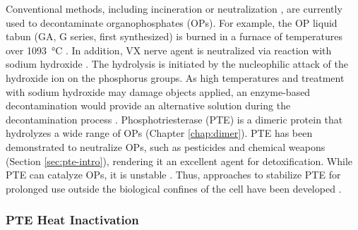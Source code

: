 \begin{refsection}
Conventional methods, including incineration or neutralization
\cite{Ghanem2005a,Porzio2007}, are currently used to decontaminate
organophosphates (OPs).  For example, the OP liquid tabun (GA, G series, first
synthesized) is burned in a furnace of temperatures over \SI{1093}{\celsius}
\cite{Afriat-Jurnou2012}.  In addition, VX nerve agent is neutralized via
reaction with sodium hydroxide \cite{Afriat-Jurnou2012}. The hydrolysis is
initiated by the nucleophilic attack of the hydroxide ion on the phosphorus
groups. As high temperatures and treatment with sodium hydroxide may damage
objects applied, an enzyme-based decontamination would provide an alternative
solution during the decontamination process \cite{Defrank}.  Phosphotriesterase
(PTE) is a dimeric protein that hydrolyzes a wide range of OPs \cite{
Lewis1988,Chen2007a,Mulbry1989,Benning2001a,Omburo1992a,Benning1995,Naqvi2014}
(Chapter \ref{chap:dimer}).  PTE has been demonstrated to neutralize OPs, such
as pesticides and chemical weapons
\cite{Chen-Goodspeed2001a,Hanusa2011,Aubert2004b,Chen-Goodspeed2001a,Bigley2013}
(Section \ref{sec:pte-intro}), rendering it an excellent agent for
detoxification. While PTE can catalyze OPs, it is unstable
\cite{Rochu2002b,LeJeune1997a,Tsai2012b,Defrank}.  Thus, approaches to
stabilize PTE for prolonged use outside the biological confines of the cell
have been developed
\cite{Rochu2002b,LeJeune1997a,Tsai2012b,Defrank,Yang2014a,Baker2011b}. 

\subsubsection{PTE Heat Inactivation}


\end{refsection}
